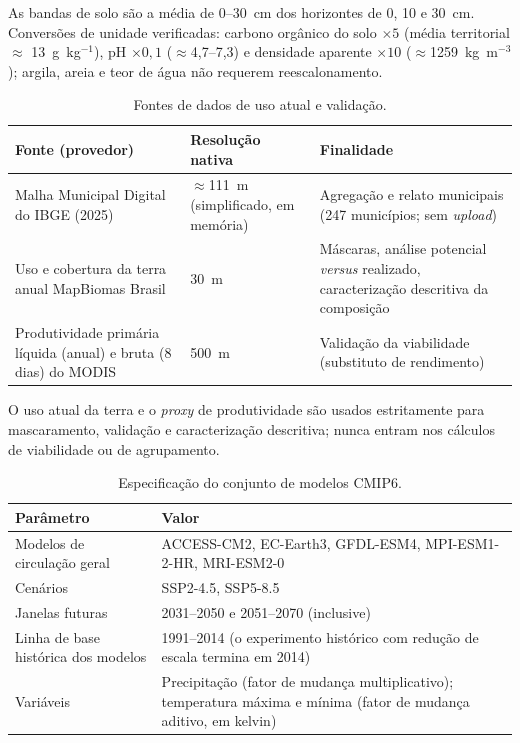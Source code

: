 As bandas de solo são a média de 0--30~cm dos horizontes de 0, 10 e 30~cm. Conversões de
unidade verificadas: carbono orgânico do solo $\times 5$ (média territorial $\approx$
13~g~kg$^{-1}$), pH $\times 0{,}1$ ($\approx$4,7--7,3) e densidade aparente $\times 10$
($\approx$1259~kg~m$^{-3}$); argila, areia e teor de água não requerem reescalonamento.

\begin{table}[H]
\centering
\caption{Fontes de dados de uso atual e validação.}
\label{tab:src-realized}
\begin{tabular}{@{}p{5cm}p{2.7cm}p{6cm}@{}}
\toprule
Fonte (provedor) & Resolução nativa & Finalidade \\
\midrule
Malha Municipal Digital do IBGE (2025) & $\approx$111~m (simplificado, em memória) & Agregação e
  relato municipais (247 municípios; sem \emph{upload}) \\
Uso e cobertura da terra anual MapBiomas Brasil & 30~m & Máscaras, análise potencial
  \emph{versus} realizado, caracterização descritiva da composição \\
Produtividade primária líquida (anual) e bruta (8 dias) do MODIS & 500~m & Validação da
  viabilidade (substituto de rendimento) \\
\bottomrule
\end{tabular}
\end{table}

O uso atual da terra e o \emph{proxy} de produtividade são usados estritamente para
mascaramento, validação e caracterização descritiva; nunca entram nos cálculos de viabilidade
ou de agrupamento.

\begin{table}[H]
\centering
\caption{Especificação do conjunto de modelos CMIP6.}
\label{tab:cmip6-spec}
\begin{tabular}{@{}p{4.5cm}p{9.5cm}@{}}
\toprule
Parâmetro & Valor \\
\midrule
Modelos de circulação geral & ACCESS-CM2, EC-Earth3, GFDL-ESM4, MPI-ESM1-2-HR, MRI-ESM2-0 \\
Cenários & SSP2-4.5, SSP5-8.5 \\
Janelas futuras & 2031--2050 e 2051--2070 (inclusive) \\
Linha de base histórica dos modelos & 1991--2014 (o experimento histórico com redução de
  escala termina em 2014) \\
Variáveis & Precipitação (fator de mudança multiplicativo); temperatura máxima e mínima
  (fator de mudança aditivo, em kelvin) \\
\bottomrule
\end{tabular}
\end{table}

